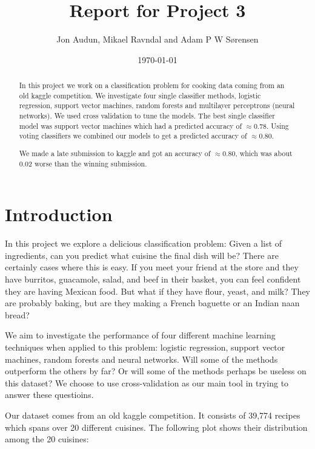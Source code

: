 \documentclass[parskip=half]{scrartcl}
\title{Report for Project 3}
\date{\today}
\author{Jon Audun, Mikael Ravndal and Adam P W S{\o}rensen}
\theoremstyle{definition}
\theoremstyle{remark}
\begin{document}

\maketitle

\begin{abstract}
In this project we work on a classification problem for cooking data coming from an old kaggle competition.
We investigate four single classifier methods, logistic regression, support vector machines, random forests and multilayer perceptrons (neural networks). 
We used cross validation to tune the models.
The best single classifier model was support vector machines which had a predicted accuracy of $\approx 0.78$. 
Using voting classifiers we combined our models to get a predicted accuracy of $\approx 0.80$. 

We made a late submission to kaggle and got an accuracy of $\approx 0.80$, which was about $0.02$ worse than the winning submission. 
\end{abstract}


\section{Introduction}

In this project we explore a delicious classification problem: 
Given a list of ingredients, can you predict what cuisine the final dish will be?
There are certainly cases where this is easy. 
If you meet your friend at the store and they have burritos, guacamole, salad, and beef in their basket, you can feel confident they are having Mexican food. 
But what if they have flour, yeast, and milk? 
They are probably baking, but are they making a French baguette or an Indian naan bread?   

We aim to investigate the performance of four different
machine learning techniques when applied to this problem: 
logistic regression, support vector machines, random forests and neural
networks. Will 
some of the methods outperform the others by far? Or will some of the 
methods perhaps be useless on this dataset?
We choose to use cross-validation as our main tool in trying to answer 
these questioins.

Our dataset comes from an old kaggle competition. 
It consists of 39,774 recipes which spans over 20 different cuisines.
The following plot shows their distribution among the 20 cuisines:
\end{document}
